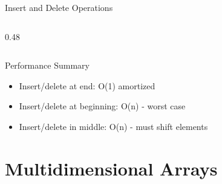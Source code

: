\documentclass[aspectratio=169,xcolor=dvipsnames]{beamer}
\begin{document}
\begin{frame}[fragile]{Insert and Delete Operations}
\begin{columns}
\begin{column}{0.48\textwidth}
    \end{column}
  \end{columns}

  \vspace{0.3cm}

  \begin{alertblock}{Performance Summary}
    \begin{itemize}
      \item Insert/delete at end: O(1) amortized
      \item Insert/delete at beginning: O(n) - worst case
      \item Insert/delete in middle: O(n) - must shift elements
    \end{itemize}
  \end{alertblock}
\end{frame}

\section{Multidimensional Arrays}
\end{document}
